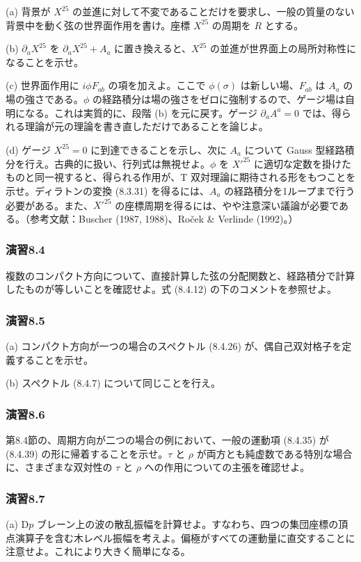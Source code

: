 (a) 背景が $X^{25}$ の並進に対して不変であることだけを要求し、一般の質量のない背景中を動く弦の世界面作用を書け。座標 $X^{25}$ の周期を $R$ とする。

(b) $\partial_aX^{25}$ を $\partial_aX^{25}+A_a$ に置き換えると、$X^{25}$ の並進が世界面上の局所対称性になることを示せ。

(c) 世界面作用に $i\phi F_{ab}$ の項を加えよ。ここで $\phi(\sigma)$ は新しい場、$F_{ab}$ は $A_a$ の場の強さである。$\phi$ の経路積分は場の強さをゼロに強制するので、ゲージ場は自明になる。これは実質的に、段階 (b) を元に戻す。ゲージ $\partial_aA^a=0$ では、得られる理論が元の理論を書き直しただけであることを論じよ。

(d) ゲージ $X^{25}=0$ に到達できることを示し、次に $A_a$ について Gauss 型経路積分を行え。古典的に扱い、行列式は無視せよ。$\phi$ を $X'^{25}$ に適切な定数を掛けたものと同一視すると、得られる作用が、T 双対理論に期待される形をもつことを示せ。ディラトンの変換 (8.3.31) を得るには、$A_a$ の経路積分を1ループまで行う必要がある。また、$X'^{25}$ の座標周期を得るには、やや注意深い議論が必要である。（参考文献：Buscher (1987, 1988)\cite{Buscher:1987sk,Buscher:1987qj}、Roček \& Verlinde (1992)\cite{Rocek:1991ps}。）

\subsubsection*{演習8.4}\label{ex:8.4}
複数のコンパクト方向について、直接計算した弦の分配関数と、経路積分で計算したものが等しいことを確認せよ。式 (8.4.12) の下のコメントを参照せよ。

\subsubsection*{演習8.5}\label{ex:8.5}
(a) コンパクト方向が一つの場合のスペクトル (8.4.26) が、偶自己双対格子を定義することを示せ。

(b) スペクトル (8.4.7) について同じことを行え。

\subsubsection*{演習8.6}\label{ex:8.6}
第8.4節の、周期方向が二つの場合の例において、一般の運動項 (8.4.35) が (8.4.39) の形に帰着することを示せ。$\tau$ と $\rho$ が両方とも純虚数である特別な場合に、さまざまな双対性の $\tau$ と $\rho$ への作用についての主張を確認せよ。

\subsubsection*{演習8.7}\label{ex:8.7}
(a) D$p$ ブレーン上の波の散乱振幅を計算せよ。すなわち、四つの集団座標の頂点演算子を含む木レベル振幅を考えよ。偏極がすべての運動量に直交することに注意せよ。これにより大きく簡単になる。

